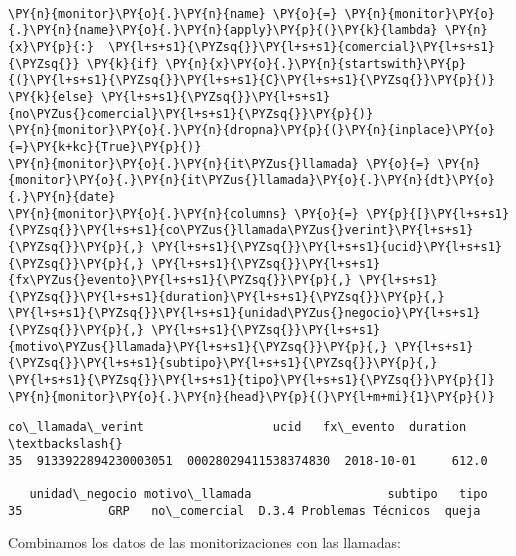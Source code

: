 \begin{tcolorbox}[breakable, size=fbox, boxrule=1pt, pad at break*=1mm,colback=cellbackground, colframe=cellborder]
\begin{Verbatim}[commandchars=\\\{\}]
        
\PY{n}{monitor}\PY{o}{.}\PY{n}{name} \PY{o}{=} \PY{n}{monitor}\PY{o}{.}\PY{n}{name}\PY{o}{.}\PY{n}{apply}\PY{p}{(}\PY{k}{lambda} \PY{n}{x}\PY{p}{:}  \PY{l+s+s1}{\PYZsq{}}\PY{l+s+s1}{comercial}\PY{l+s+s1}{\PYZsq{}} \PY{k}{if} \PY{n}{x}\PY{o}{.}\PY{n}{startswith}\PY{p}{(}\PY{l+s+s1}{\PYZsq{}}\PY{l+s+s1}{C}\PY{l+s+s1}{\PYZsq{}}\PY{p}{)} \PY{k}{else} \PY{l+s+s1}{\PYZsq{}}\PY{l+s+s1}{no\PYZus{}comercial}\PY{l+s+s1}{\PYZsq{}}\PY{p}{)}
\PY{n}{monitor}\PY{o}{.}\PY{n}{dropna}\PY{p}{(}\PY{n}{inplace}\PY{o}{=}\PY{k+kc}{True}\PY{p}{)}
\PY{n}{monitor}\PY{o}{.}\PY{n}{it\PYZus{}llamada} \PY{o}{=} \PY{n}{monitor}\PY{o}{.}\PY{n}{it\PYZus{}llamada}\PY{o}{.}\PY{n}{dt}\PY{o}{.}\PY{n}{date}
\PY{n}{monitor}\PY{o}{.}\PY{n}{columns} \PY{o}{=} \PY{p}{[}\PY{l+s+s1}{\PYZsq{}}\PY{l+s+s1}{co\PYZus{}llamada\PYZus{}verint}\PY{l+s+s1}{\PYZsq{}}\PY{p}{,} \PY{l+s+s1}{\PYZsq{}}\PY{l+s+s1}{ucid}\PY{l+s+s1}{\PYZsq{}}\PY{p}{,} \PY{l+s+s1}{\PYZsq{}}\PY{l+s+s1}{fx\PYZus{}evento}\PY{l+s+s1}{\PYZsq{}}\PY{p}{,} \PY{l+s+s1}{\PYZsq{}}\PY{l+s+s1}{duration}\PY{l+s+s1}{\PYZsq{}}\PY{p}{,} \PY{l+s+s1}{\PYZsq{}}\PY{l+s+s1}{unidad\PYZus{}negocio}\PY{l+s+s1}{\PYZsq{}}\PY{p}{,} \PY{l+s+s1}{\PYZsq{}}\PY{l+s+s1}{motivo\PYZus{}llamada}\PY{l+s+s1}{\PYZsq{}}\PY{p}{,} \PY{l+s+s1}{\PYZsq{}}\PY{l+s+s1}{subtipo}\PY{l+s+s1}{\PYZsq{}}\PY{p}{,} \PY{l+s+s1}{\PYZsq{}}\PY{l+s+s1}{tipo}\PY{l+s+s1}{\PYZsq{}}\PY{p}{]}
\PY{n}{monitor}\PY{o}{.}\PY{n}{head}\PY{p}{(}\PY{l+m+mi}{1}\PY{p}{)}
\end{Verbatim}
\end{tcolorbox}

            \begin{tcolorbox}[breakable, size=fbox, boxrule=.5pt, pad at break*=1mm, opacityfill=0]
\begin{Verbatim}[commandchars=\\\{\}]
      co\_llamada\_verint                  ucid   fx\_evento  duration  \textbackslash{}
35  9133922894230003051  00028029411538374830  2018-10-01     612.0

   unidad\_negocio motivo\_llamada                   subtipo   tipo
35            GRP   no\_comercial  D.3.4 Problemas Técnicos  queja

\end{Verbatim}
\end{tcolorbox}
        
    Combinamos los datos de las monitorizaciones con las llamadas:

\vspace{0.5cm}

